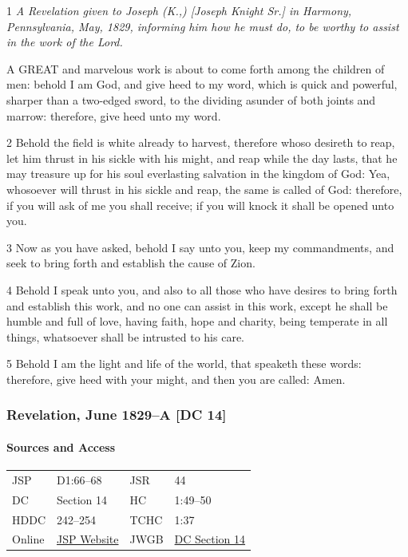 				1 \textit{A Revelation given to Joseph (K.,) [Joseph Knight Sr.] in Harmony, Pennsylvania, May, 1829, informing him how he must do, to be worthy to assist in the work of the Lord.}
				
				A GREAT and marvelous work is about to come forth among the children of men: behold I am God, and give heed to my word, which is quick and powerful, sharper than a two-edged sword, to the dividing asunder of both joints and marrow: therefore, give heed unto my word.

				2 Behold the field is white already to harvest, therefore whoso desireth to reap, let him thrust in his sickle with his might, and reap while the day lasts, that he may treasure up for his soul everlasting salvation in the kingdom of God: Yea, whosoever will thrust in his sickle and reap, the same is called of God: therefore, if you will ask of me you shall receive; if you will knock it shall be opened unto you.

				3 Now as you have asked, behold I say unto you, keep my commandments, and seek to bring forth and establish the cause of Zion.

				4 Behold I speak unto you, and also to all those who have desires to bring forth and establish this work, and no one can assist in this work, except he shall be humble and full of love, having faith, hope and charity, being temperate in all things, whatsoever shall be intrusted to his care.

				5 Behold I am the light and life of the world, that speaketh these words: therefore, give heed with your might, and then you are called: Amen.
			
		\subsubsection{Revelation, June 1829--A [DC 14]}
			\label{EMS-1828-1829-JS-JUN-1829-A}
			
			\paragraph{Sources and Access}

				\begin{tabular}{p{1in}p{1.5in}p{1in}p{1.5in}}
				JSP	 	& D1:66--68		& JSR 		& 44		 \\  
				DC	 	& Section 14 	& HC 		& 1:49--50	 \\
				HDDC 	& 242--254 		& TCHC 		& 1:37		 \\
				Online  & \href{https://www.josephsmithpapers.org/paper-summary/revelation-june-1829-a-dc-14/1}{JSP Website} & 
				JWGB	& \hyperref[DC14]{DC Section 14} \\
				\end{tabular}
			
